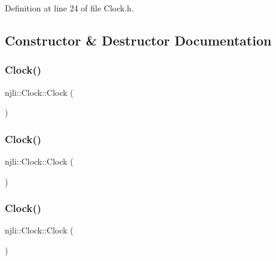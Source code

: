 Definition at line 24 of file Clock.\+h.



\subsection{Constructor \& Destructor Documentation}
\mbox{\label{classnjli_1_1_clock_a46fe51eb140fd7a3e6a011d511a7263f}} 
\subsubsection{\texorpdfstring{Clock()}{Clock()}\hspace{0.1cm}{\footnotesize\ttfamily [1/3]}}
{\footnotesize\ttfamily njli\+::\+Clock\+::\+Clock (\begin{DoxyParamCaption}{ }\end{DoxyParamCaption})\hspace{0.3cm}{\ttfamily [protected]}}

\mbox{\label{classnjli_1_1_clock_a7e5e8e455e01fc4deb3174770a9a3532}} 
\subsubsection{\texorpdfstring{Clock()}{Clock()}\hspace{0.1cm}{\footnotesize\ttfamily [2/3]}}
{\footnotesize\ttfamily njli\+::\+Clock\+::\+Clock (\begin{DoxyParamCaption}\item[{const \mbox{\hyperlink{classnjli_1_1_abstract_builder}{Abstract\+Builder}} \&}]{ }\end{DoxyParamCaption})\hspace{0.3cm}{\ttfamily [protected]}}

\mbox{\label{classnjli_1_1_clock_a25793091ce80c61997437fb69efedb50}} 
\subsubsection{\texorpdfstring{Clock()}{Clock()}\hspace{0.1cm}{\footnotesize\ttfamily [3/3]}}
{\footnotesize\ttfamily njli\+::\+Clock\+::\+Clock (\begin{DoxyParamCaption}\item[{const \mbox{\hyperlink{classnjli_1_1_clock}{Clock}} \&}]{ }\end{DoxyParamCaption})\hspace{0.3cm}{\ttfamily [protected]}}

